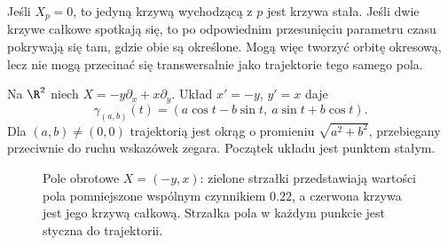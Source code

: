 Jeśli $X_p=0$, to jedyną krzywą wychodzącą z $p$ jest krzywa stała.
Jeśli dwie krzywe całkowe spotkają się, to po odpowiednim przesunięciu
parametru czasu pokrywają się tam, gdzie obie są określone.
Mogą więc tworzyć orbitę okresową, lecz nie mogą przecinać się
transwersalnie jako trajektorie tego samego pola.

\begin{przyklad}[Obrót]
Na $\R^2$ niech $X=-y\partial_x+x\partial_y$. Układ
$x'=-y$, $y'=x$ daje
\begin{equation}\label{eq:obrot}
 \gamma_{(a,b)}(t)=(a\cos t-b\sin t,\ a\sin t+b\cos t).
\end{equation}
Dla $(a,b)\ne(0,0)$ trajektorią jest okrąg o promieniu
$\sqrt{a^2+b^2}$, przebiegany przeciwnie do ruchu wskazówek zegara.
Początek układu jest punktem stałym.
\end{przyklad}

\begin{figure}[!htbp]
\centering
{}
\caption{Pole obrotowe $X=(-y,x)$: zielone strzałki przedstawiają wartości
pola pomniejszone wspólnym czynnikiem $0.22$,
a czerwona krzywa jest jego krzywą całkową. Strzałka pola
w każdym punkcie jest styczna do trajektorii.}
\label{fig:obrot-krzywa}
\end{figure}


